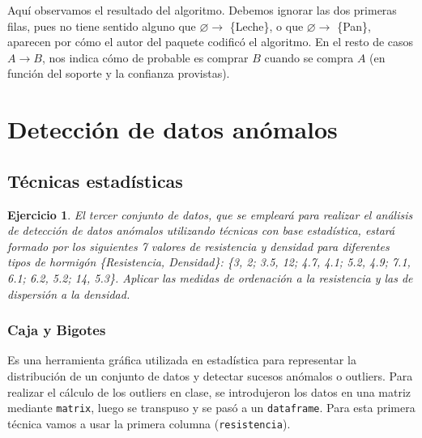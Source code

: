 \documentclass[12pt]{report}\usepackage[]{graphicx}\usepackage[dvipsnames]{xcolor}
\newtheorem{exercise}{Ejercicio}[section]
\begin{document}
			Aquí observamos el resultado del algoritmo. Debemos ignorar las dos primeras filas, pues no tiene sentido alguno que $\varnothing \rightarrow$ \{Leche\}, o que $\varnothing \rightarrow$ \{Pan\}, aparecen por cómo el autor del paquete codificó el algoritmo. En el resto de casos $A \rightarrow B$, nos indica cómo de probable es comprar $B$ cuando se compra $A$ (en función del soporte y la confianza provistas). 
			
			
		\section{Detección de datos anómalos}
			
			\subsection{Técnicas estadísticas}
			
				\begin{exercise}
					El tercer conjunto de datos, que se empleará para realizar el análisis de detección de datos anómalos utilizando técnicas con base estadística, estará formado por los siguientes 7 valores de resistencia y densidad para diferentes tipos de hormigón \{Resistencia, Densidad\}: \{3, 2; 3.5, 12; 4.7, 4.1; 5.2, 4.9; 7.1, 6.1; 6.2, 5.2; 14, 5.3\}. Aplicar las medidas de ordenación a la resistencia y las de dispersión a la densidad.
				\end{exercise}
				
				\subsubsection{Caja y Bigotes}\label{subsub:caja_bigotes}
				
					Es una herramienta gráfica utilizada en estadística para representar la distribución de un conjunto de datos y detectar sucesos anómalos o outliers. Para realizar el cálculo de los outliers en clase, se introdujeron los datos en una matriz mediante \texttt{matrix}, luego se transpuso y se pasó a un \texttt{dataframe}. Para esta primera técnica vamos a usar la primera columna (\texttt{resistencia}).
					
\end{document}
